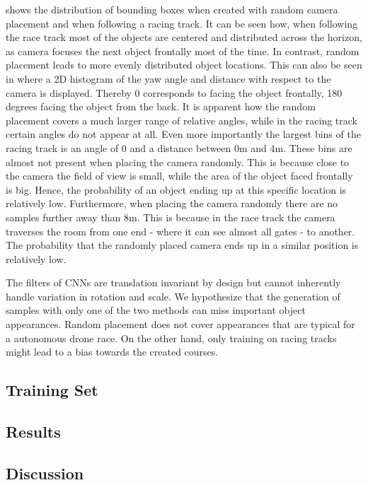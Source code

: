  shows the distribution of bounding boxes when created with random camera placement and when following a racing track. It can be seen how, when following the race track most of the objects are centered and distributed across the horizon, as camera focuses the next object frontally most of the time. In contrast, random placement leads to more evenly distributed object locations. This can also be seen in  where a 2D histogram of the yaw angle and distance with respect to the camera is displayed. Thereby 0 corresponds to facing the object frontally, 180 degrees facing the object from the back. It is apparent how the random placement covers a much larger range of relative angles, while in the racing track certain angles do not appear at all. Even more importantly the largest bins of the racing track is an angle of 0 and a distance between 0m and 4m. These bins are almost not present when placing the camera randomly. This is because close to the camera the field of view is small, while the area of the object faced frontally is big. Hence, the probability of an object ending up at this specific location is relatively low. Furthermore, when placing the camera randomly there are no samples further away than 8m. This is because in the race track the camera traverses the room from one end - where it can see almost all gates - to another. The probability that the randomly placed camera ends up in a similar position is relatively low.

The filters of \acp{CNN} are translation invariant by design but cannot inherently handle variation in rotation and scale. We hypothesize that the generation of samples with only one of the two methods can miss important object appearances. Random placement does not cover appearances that are typical for a autonomous drone race. On the other hand, only training on racing tracks might lead to a bias towards the created courses.

\subsection{Training Set}

\subsection{Results}
\subsection{Discussion}
